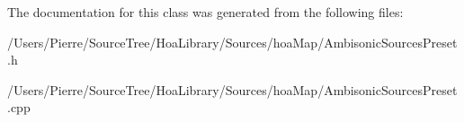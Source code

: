 The documentation for this class was generated from the following files\-:\begin{DoxyCompactItemize}
\item 
/\-Users/\-Pierre/\-Source\-Tree/\-Hoa\-Library/\-Sources/hoa\-Map/Ambisonic\-Sources\-Preset.\-h\item 
/\-Users/\-Pierre/\-Source\-Tree/\-Hoa\-Library/\-Sources/hoa\-Map/Ambisonic\-Sources\-Preset.\-cpp\end{DoxyCompactItemize}
